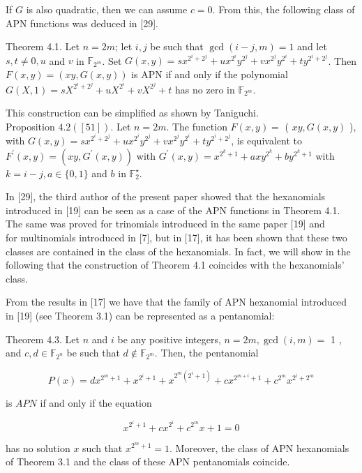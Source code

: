 \documentclass[10pt]{article}
\begin{document}
If $G$ is also quadratic, then we can assume $c=0$. From this, the following class of APN functions was deduced in [29].

Theorem 4.1. Let $n=2 m$; let $i, j$ be such that $\operatorname{gcd}(i-j, m)=1$ and let $s, t \neq 0, u$ and $v$ in $\mathbb{F}_{2^{m}}$. Set $G(x, y)=s x^{2^{i}+2^{j}}+u x^{2^{i}} y^{2^{j}}+v x^{2^{j}} y^{2^{i}}+t y^{2^{i}+2^{j}}$. Then $F(x, y)=(x y, G(x, y))$ is APN if and only if the polynomial $G(X, 1)= s X^{2^{i}+2^{j}}+u X^{2^{i}}+v X^{2^{j}}+t$ has no zero in $\mathbb{F}_{2^{m}}$.

This construction can be simplified as shown by Taniguchi.\\
Proposition $4.2([51])$. Let $n=2 m$. The function $F(x, y)=$ ( $x y, G(x, y)$ ), with $G(x, y)=s x^{2^{i}+2^{j}}+u x^{2^{i}} y^{2^{j}}+v x^{2^{j}} y^{2^{i}}+t y^{2^{i}+2^{j}}$, is equivalent to $F^{\prime}(x, y)=\left(x y, G^{\prime}(x, y)\right)$ with $G^{\prime}(x, y)=x^{2^{k}+1}+a x y^{2^{k}}+b y^{2^{k}+1}$ with $k=i-j, a \in\{0,1\}$ and $b$ in $\mathbb{F}_{2}^{\star}$.

In [29], the third author of the present paper showed that the hexanomials introduced in [19] can be seen as a case of the APN functions in Theorem 4.1. The same was proved for trinomials introduced in the same paper [19] and\\[0pt]
for multinomials introduced in [7], but in [17], it has been shown that these two classes are contained in the class of the hexanomials. In fact, we will show in the following that the construction of Theorem 4.1 coincides with the hexanomials' class.

From the results in [17] we have that the family of APN hexanomial introduced in [19] (see Theorem 3.1) can be represented as a pentanomial:

Theorem 4.3. Let $n$ and $i$ be any positive integers, $n=2 m, \operatorname{gcd}(i, m)=$ 1 , and $c, d \in \mathbb{F}_{2^{n}}$ be such that $d \notin \mathbb{F}_{2^{m}}$. Then, the pentanomial

$$
P(x)=d x^{2^{m}+1}+x^{2^{i}+1}+x^{2^{m}\left(2^{i}+1\right)}+c x^{2^{m+i}+1}+c^{2^{m}} x^{2^{i}+2^{m}}
$$

is $A P N$ if and only if the equation

$$
x^{2^{i}+1}+c x^{2^{i}}+c^{2^{m}} x+1=0
$$

has no solution $x$ such that $x^{2^{m}+1}=1$. Moreover, the class of APN hexanomials of Theorem 3.1 and the class of these APN pentanomials coincide.
\end{document}
